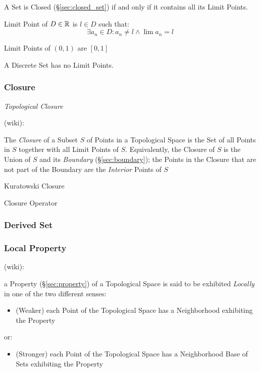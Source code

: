 A Set is Closed (\S\ref{sec:closed_set}) if and only if it contains all its
Limit Points.

Limit Point of $D \in \mathbb{R}$ is $l \in D$ such that:
\[
  \exists a_n \in D : a_n \neq l \wedge \lim a_n = l
\]

Limit Points of $(0,1)$ are $[0,1]$

A Discrete Set has no Limit Points. %



\subsubsection{Closure}\label{sec:topological_closure}

\emph{Topological Closure}

(wiki):

The \emph{Closure} of a Subset $S$ of Points in a Topological Space is the Set
of all Points in $S$ together with all Limit Points of $S$. Equivalently, the
Closure of $S$ is the Union of $S$ and its \emph{Boundary}
(\S\ref{sec:boundary}); the Points in the Closure that are not part of the
Boundary are the \emph{Interior} Points of $S$

Kuratowski Closure

Closure Operator



\subsubsection{Derived Set}\label{sec:derived_set}

\subsubsection{Local Property}\label{sec:local_property}

(wiki):

a Property (\S\ref{sec:property}) of a Topological Space is said to be exhibited
\emph{Locally} in one of the two different senses:
\begin{itemize}
  \item (Weaker) each Point of the Topological Space has a Neighborhood
    exhibiting the Property
\end{itemize}
or:
\begin{itemize}
  \item (Stronger) each Point of the Topological Space has a Neighborhood Base
    of Sets exhibiting the Property
\end{itemize}

